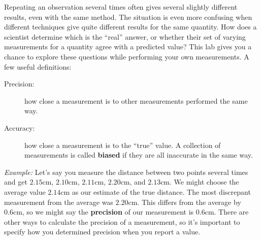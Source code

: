 \documentclass[12pt]{article}%
\begin{document}
Repeating an observation several times often gives several slightly
different results, even with the same method. The situation is even
more confusing when different techniques give quite different results
for the same quantity. How does a scientist determine which is the
``real'' answer, or whether their set of varying measurements for a
quantity agree with a predicted value? This lab gives you a chance to
explore these questions while performing your own measurements.
A few useful definitions:
\begin{description}
\item[Precision:] how close a measurement is to other measurements
performed the same way.
\item[Accuracy:] how close a measurement is to the ``true'' value. A collection of measurements is called
\textbf{biased} if they are all inaccurate in the same way.
\end{description}

\textit{Example:} Let's say you measure the distance between two points several times
and get $2.15\mathrm{cm}$, $2.10\mathrm{cm}$, $2.11\mathrm{cm}$,
$2.20\mathrm{cm}$, and $2.13\mathrm{cm}$.
We might choose the average value $2.14\mathrm{cm}$ as our estimate of the true
distance.
The most discrepant measurement from the average was $2.20\mathrm{cm}$. This
differs from the average by $0.6\mathrm{cm}$, so we might say the {\bf
precision} of our measurement is $0.6\mathrm{cm}$.
There are other ways to calculate the precision of a measurement, so it's
important to specify how you determined precision when you report a value.
\end{document}

